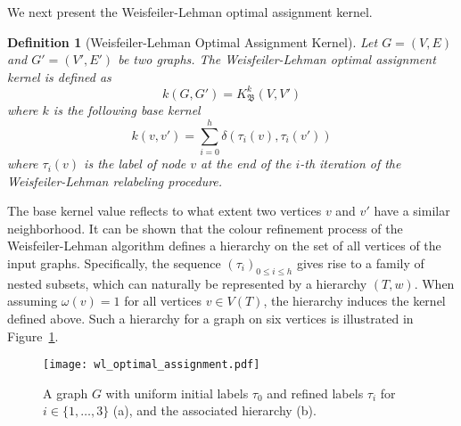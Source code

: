 \documentclass[twoside,11pt]{article}
\newtheorem{definition}{Definition}
\begin{document}
We next present the Weisfeiler-Lehman optimal assignment kernel.
\begin{definition}[Weisfeiler-Lehman Optimal Assignment Kernel]
  Let $G=(V,E)$ and $G'=(V',E')$ be two graphs.
  The Weisfeiler-Lehman optimal assignment kernel is defined as
  \begin{equation}
    k(G,G') = K_\mathfrak{B}^k(V,V')
  \end{equation}
  where $k$ is the following base kernel
  \begin{equation}
    k(v,v') = \sum_{i=0}^h \delta(\tau_i(v), \tau_i(v'))
  \end{equation}
  where $\tau_i(v)$ is the label of node $v$ at the end of the $i$-th iteration of the Weisfeiler-Lehman relabeling procedure.
\end{definition}
The base kernel value reflects to what extent two vertices $v$ and $v'$ have a similar neighborhood.
It can be shown that the colour refinement process of the Weisfeiler-Lehman algorithm defines a hierarchy on the set of all vertices of the input graphs.
Specifically, the sequence $(\tau_i)_{0\leq i \leq h}$ gives rise to a family of nested subsets, which can naturally be represented by a hierarchy $(T,w)$.
When assuming $\omega(v) = 1$ for all vertices $v \in V(T)$, the hierarchy induces the kernel defined above.
Such a hierarchy for a graph on six vertices is illustrated in Figure~\ref{fig:wl_optimal_assignment}.
\begin{figure}[t]
  \centering
  \texttt{[image: wl\_optimal\_assignment.pdf]}
    \caption{A graph $G$ with uniform initial labels $\tau_0$ and refined labels $\tau_i$ for $i \in \{1,\ldots,3\}$ (a), and the associated hierarchy (b).}
    \label{fig:wl_optimal_assignment}
\end{figure}
\end{document}
